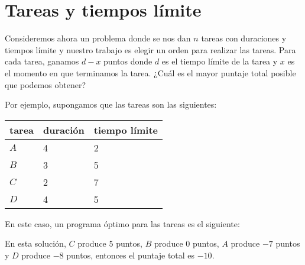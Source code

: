 \section{Tareas y tiempos límite}

Consideremos ahora un problema donde
se nos dan $n$ tareas con duraciones y tiempos límite
y nuestro trabajo es elegir un orden para realizar las tareas.
Para cada tarea, ganamos $d-x$ puntos
donde $d$ es el tiempo límite de la tarea
y $x$ es el momento en que terminamos la tarea.
¿Cuál es el mayor puntaje total posible
que podemos obtener?

Por ejemplo, supongamos que las tareas son las siguientes:
\begin{center}
    \begin{tabular}{lll}
        tarea & duración & tiempo límite \\
        \hline
        $A$   & 4        & 2             \\
        $B$   & 3        & 5             \\
        $C$   & 2        & 7             \\
        $D$   & 4        & 5             \\
    \end{tabular}
\end{center}
En este caso, un programa óptimo para las tareas
es el siguiente:
\begin{center}
\end{center}
En esta solución, $C$ produce 5 puntos,
$B$ produce 0 puntos, $A$ produce $-7$ puntos
y $D$ produce $-8$ puntos,
entonces el puntaje total es $-10$.


